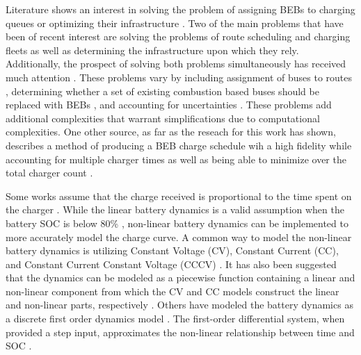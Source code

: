 \documentclass[11pt,a4paper,final]{article}
\begin{document}
Literature shows an interest in solving the problem of assigning BEBs to charging queues or optimizing their
infrastructure \cite{wei-2018-optim-spatio,sebastiani-2016-evaluat-elect,hoke-2014-accoun-lithium,wang-2017-elect-vehic}. Two of the main problems that have been of recent interest are
solving the problems of route scheduling and charging fleets as well as determining the infrastructure upon which they
rely. Additionally, the prospect of solving both problems simultaneously has received much attention
\cite{wei-2018-optim-spatio,sebastiani-2016-evaluat-elect,hoke-2014-accoun-lithium,wang-2017-elect-vehic}. These
problems vary by including assignment of buses to routes \cite{rinaldi-2020-mixed-fleet,zhou-2020-collab-optim,tang-2019-robus-sched,li-2014-trans-bus}, determining whether a set of existing combustion based buses should be
replaced with BEBs \cite{zhou-2020-bi-objec,duan-2021-refor-mixed,rinaldi-2020-mixed-fleet,zhou-2020-collab-optim}, and accounting for uncertainties \cite{bie-2021-optim-elect,duan-2021-refor-mixed,tang-2019-robus-sched,ursavas-2016-optim-polic}. These problems add additional complexities that warrant
simplifications due to computational complexities. One other source, as far as the reseach for this work has shown,
describes a method of producing a BEB charge schedule wih a high fidelity while accounting for multiple charger times as
well as being able to minimize over the total charger count \cite{whitaker-2023-a-network}.

Some works assume that the charge received is proportional to the time spent on the charger
\cite{liu-2020-batter-elect,yang-2018-charg-sched}. While the linear battery dynamics is a valid assumption when the
battery SOC is below 80\% \cite{liu-2020-batter-elect}, non-linear battery dynamics can be implemented to more
accurately model the charge curve. A common way to model the non-linear battery dynamics is utilizing Constant Voltage
(CV), Constant Current (CC), and Constant Current Constant Voltage (CCCV) \cite{abdollahi-2016-optim-batter,chen-2008-desig-grey}. It has also been suggested that the dynamics can be modeled as a piecewise function containing a
linear and non-linear component from which the CV and CC models construct the linear and non-linear parts, respectively
\cite{zhang-2021-optim-elect,abdollahi-2016-optim-batter}. Others have modeled the battery dynamics as a discrete
first order dynamics model \cite{whitaker-2023-a-network}. The first-order differential system, when provided a step
input, approximates the non-linear relationship between time and SOC \cite{whitaker-2023-a-network}.
\end{document}
